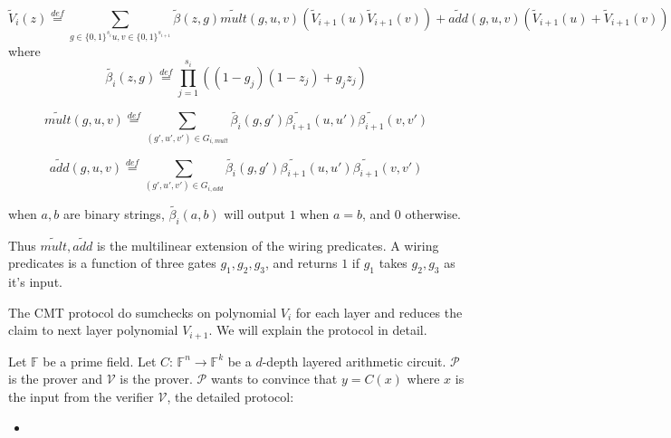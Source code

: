 \begin{definition}
$$\tilde{V}_{i}(z)\overset{def}{=}\sum_{g\in\{0,1\}^{s_i} u, v\in \{0,1\}^{s_{i+1}}}\tilde{\beta}(z, g)\tilde{mult}(g, u, v)(\tilde{V}_{i+1}(u)\tilde{V}_{i+1}(v))+\tilde{add}(g,u,v)(\tilde{V}_{i+1}(u)+\tilde{V}_{i+1}(v))$$
where $$\tilde{\beta_{i}}(z,g)\overset{def}{=}\prod_{j=1}^{s_{i}}((1-g_{j})(1-z_{j})+g_{j}z_{j})$$

$$\tilde{mult}(g,u,v)\overset{def}{=}\sum_{(g', u', v')\in G_{i,mult}}\tilde{\beta_{i}}(g,g')\tilde{\beta_{i+1}}(u,u')\tilde{\beta_{i+1}}(v,v')$$

$$\tilde{add}(g,u,v)\overset{def}{=}\sum_{(g', u', v')\in G_{i,add}}\tilde{\beta_{i}}(g,g')\tilde{\beta_{i+1}}(u,u')\tilde{\beta_{i+1}}(v,v')$$

when $a, b$ are binary strings, $\tilde{\beta_{i}}(a, b)$ will output $1$ when $a=b$, and $0$ otherwise.

Thus $\tilde{mult},\tilde{add}$ is the multilinear extension of the wiring predicates. A wiring predicates is a function of three gates $g_1, g_2, g_3$, and returns $1$ if $g_1$ takes $g_2, g_3$ as it's input.

\end{definition}

The CMT protocol do sumchecks on polynomial $V_{i}$ for each layer and reduces the claim to next layer polynomial $V_{i+1}$. We will explain the protocol in detail.

\begin{protocol}
Let $\mathbb{F}$ be a prime field. Let $C$: $\mathbb{F}^n\rightarrow \mathbb{F}^k$ be a $d$-depth layered arithmetic circuit. $\mathcal{P}$ is the prover and $\mathcal{V}$ is the prover. $\mathcal{P}$ wants to convince that $y=C(x)$ where $x$ is the input from the verifier $\mathcal{V}$, the detailed protocol:

\begin{itemize}
	\item
\end{itemize}
\end{protocol}